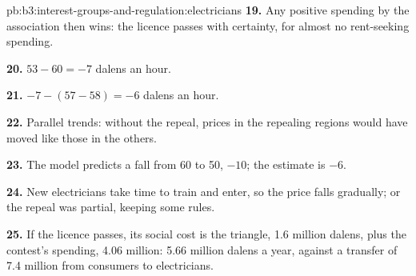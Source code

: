 \begin{solution}{pb:b3:interest-groups-and-regulation:electricians}
\textbf{19.} Any positive spending by the association then wins: the licence passes
with certainty, for almost no rent-seeking spending.

\textbf{20.} $53 - 60 = -7$ dalens an hour.

\textbf{21.} $-7 - (57 - 58) = -6$ dalens an hour.

\textbf{22.} Parallel trends: without the repeal, prices in the repealing regions
would have moved like those in the others.

\textbf{23.} The model predicts a fall from 60 to 50, $-10$; the estimate is $-6$.

\textbf{24.} New electricians take time to train and enter, so the price falls
gradually; or the repeal was partial, keeping some rules.

\textbf{25.} If the licence passes, its social cost is the triangle, 1.6 million dalens,
plus the contest's spending, 4.06 million: 5.66 million dalens a year, against a
transfer of 7.4 million from consumers to electricians.
\end{solution}
